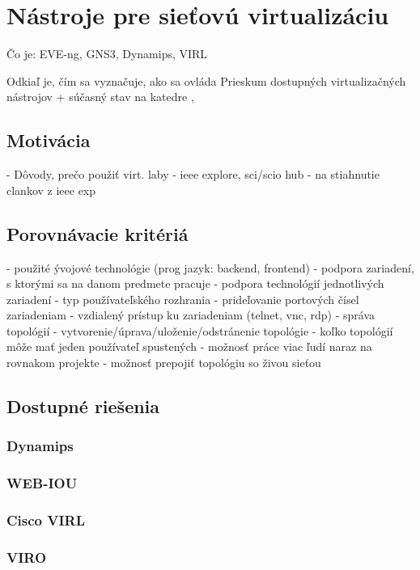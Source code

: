 \chapter{Nástroje pre sieťovú virtualizáciu}

Čo je:
EVE-ng, GNS3, Dynamips, VIRL 

Odkiaľ je, čím sa vyznačuje, ako sa ovláda
Prieskum dostupných virtualizačných nástrojov + súčasný stav na katedre \cite{pes2} \cite{bartsch2}, \cite{berman, wolfram}

\section{Motivácia}
- Dôvody, prečo použiť virt. laby
  - ieee explore, sci/scio hub - na stiahnutie clankov z ieee exp
  
\section{Porovnávacie kritériá}

- použité ývojové technológie (prog jazyk: backend, frontend)
- podpora zariadení, s ktorými sa na danom predmete pracuje
- podpora technológií jednotlivých zariadení
- typ používateľského rozhrania
- prideľovanie portových čísel zariadeniam
- vzdialený prístup ku zariadeniam (telnet, vnc, rdp)
- správa topológií
  - vytvorenie/úprava/uloženie/odstránenie topológie
  - koľko topológií môže mať jeden používateľ spustených
- možnosť práce viac ľudí naraz na rovnakom projekte
- možnosť prepojiť topológiu so živou sieťou


\section{Dostupné riešenia}

\subsection{Dynamips}

\subsection{WEB-IOU}

\subsection{Cisco VIRL}

\subsection{VIRO}

